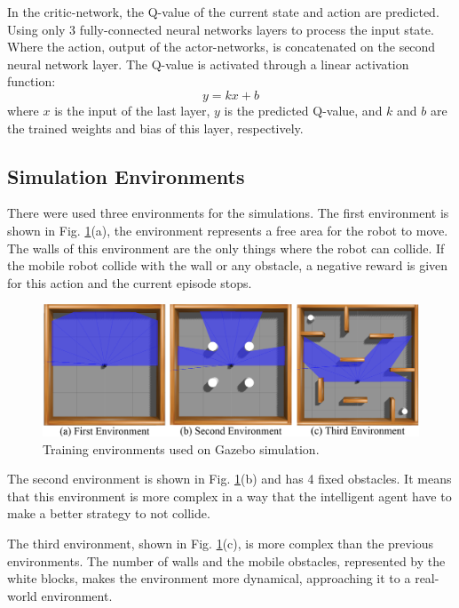 In the critic-network, the Q-value of the current state and action are predicted.
Using only 3 fully-connected neural networks layers to process the input state.
Where the action, output of the actor-networks, is concatenated on the second neural network layer.
The Q-value is activated through a linear activation function:
\begin{equation}
y = kx +b
\end{equation}
where $x$ is the input of the last layer, $y$ is the predicted Q-value, and $k$ and $b$ are the trained weights and bias of this layer, respectively.

\subsection{Simulation Environments}

There were used three environments for the simulations. The first environment is  shown in Fig. \ref{fig:environments}(a), the environment represents a free area for the robot to move.
The walls of this environment are the only things where the robot can collide.
If the mobile robot collide with the wall or any obstacle, a negative reward is given for this action and the current episode stops.

\begin{figure}[htbp]
\centerline{\includegraphics[width=\columnwidth]{images/environments1.png}}
\caption{Training environments used on Gazebo simulation.}
\label{fig:environments}
\end{figure}

The second environment is shown in Fig. \ref{fig:environments}(b) and has 4 fixed obstacles.
It means that this environment is more complex in a way that the intelligent agent have to make a better strategy to not collide.

The third environment, shown in Fig. \ref{fig:environments}(c), is more complex than the previous environments.  
The number of walls and the mobile obstacles, represented by the white blocks, makes the environment more dynamical, approaching it to a real-world environment.

